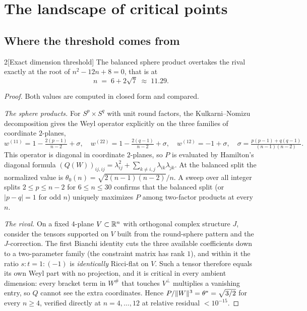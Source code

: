 \section{The landscape of critical points}\label{sec:landscape}

\subsection{Where the threshold comes from}\label{sec:threshold}

\begin{Lem}{2}[Exact dimension threshold]
The balanced sphere product overtakes the rival exactly at the root of $n^2-12n+8=0$, that is at
\[
n\;=\;6+2\sqrt7\;\approx\;11.29 .
\]
\end{Lem}

\begin{proof}
Both values are computed in closed form and compared.

\emph{The sphere products.} For $S^p\times S^q$ with unit round factors, the Kulkarni--Nomizu decomposition gives the Weyl operator explicitly on the three families of coordinate $2$-planes,
\[
w^{(11)}=1-\tfrac{2(p-1)}{n-2}+\sigma,\quad
w^{(22)}=1-\tfrac{2(q-1)}{n-2}+\sigma,\quad
w^{(12)}=-1+\sigma,\quad
\sigma=\tfrac{p(p-1)+q(q-1)}{(n-1)(n-2)} .
\]
This operator is diagonal in coordinate $2$-planes, so $P$ is evaluated by Hamilton's diagonal formula $(Q(W))_{ij,ij}=\lambda_{ij}^2+\sum_{k\ne i,j}\lambda_{ik}\lambda_{jk}$. At the balanced split the normalized value is $\theta_0(n)=\sqrt{2(n-1)(n-2)}/n$. A sweep over all integer splits $2\le p\le n-2$ for $6\le n\le30$ confirms that the balanced split (or $|p-q|=1$ for odd $n$) uniquely maximizes $P$ among two-factor products at every $n$.

\emph{The rival.} On a fixed $4$-plane $V\subset\mathbb{R}^n$ with orthogonal complex structure $J$, consider the tensors supported on $V$ built from the round-sphere pattern and the $J$-correction. The first Bianchi identity cuts the three available coefficients down to a two-parameter family (the constraint matrix has rank $1$), and within it the ratio $s:t=1:(-1)$ is \emph{identically} Ricci-flat on $V$. Such a tensor therefore equals its own Weyl part with no projection, and it is critical in every ambient dimension: every bracket term in $W^{\#}$ that touches $V^\perp$ multiplies a vanishing entry, so $Q$ cannot see the extra coordinates. Hence $P/\|W\|^3=\theta^{*}=\sqrt{3/2}$ for every $n\ge4$, verified directly at $n=4,\dots,12$ at relative residual $<10^{-15}$.


\end{proof}
